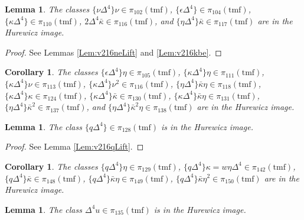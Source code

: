 \documentclass[10pt]{amsart}
\newcommand{\tmf}{\mathrm{tmf}}
\newtheorem{cor}[equation]{Corollary}
\newtheorem{lem}[equation]{Lemma}
\theoremstyle{definition}
\numberwithin{equation}{section}
\numberwithin{figure}{section}
\begin{document}

\begin{lem}\label{Lem:v216neekb}
The classes $\{ \nu \Delta^4\} \nu \in \pi_{102}(\tmf)$, $\{ \epsilon \Delta^4\} \in \pi_{104}(\tmf)$, $\{ \kappa \Delta^4 \} \in \pi_{110}(\tmf)$, $2 \Delta^4 \bar{\kappa} \in \pi_{116}(\tmf)$, and $\{\eta \Delta^4 \} \bar{\kappa} \in \pi_{117}(\tmf)$ are in the Hurewicz image.
\end{lem}

\begin{proof}
See Lemmas \ref{Lem:v216neLift} and \ref{Lem:v216kbe}. 
\end{proof}


\begin{cor}\label{Cor:v216low}
The classes $\{\epsilon \Delta^4\} \eta \in \pi_{105}(\tmf)$, $\{ \kappa \Delta^4 \} \eta \in \pi_{111}(\tmf)$, $\{ \kappa \Delta^4 \} \nu \in \pi_{113}(\tmf)$, $\{ \kappa \Delta^4 \} \nu^2 \in \pi_{116}(\tmf)$, $\{\eta \Delta^4 \} \bar{\kappa} \eta \in \pi_{118}(\tmf)$, $\{ \kappa \Delta^4 \} \kappa \in \pi_{124}(\tmf)$, $\{ \kappa \Delta^4 \} \bar{\kappa} \in \pi_{130}(\tmf)$, $\{ \kappa \Delta^4 \} \bar{\kappa} \eta \in \pi_{131}(\tmf)$, $\{\eta \Delta^4 \} \bar{\kappa}^2 \in \pi_{137}(\tmf)$, and $\{ \eta \Delta^4\} \bar{\kappa}^2 \eta \in \pi_{138}(\tmf)$ are in the Hurewicz image.
\end{cor}

\begin{lem}\label{Lem:v216q}
The class $\{q \Delta^4\} \in \pi_{128}(\tmf)$ is in the Hurewicz image. 
\end{lem}

\begin{proof}
See Lemma \ref{Lem:v216qLift}. 
\end{proof}

\begin{cor}\label{Cor:v216q}
The classes $\{ q \Delta^4 \} \eta \in \pi_{129}(\tmf)$, $\{q \Delta^4\}\kappa = w\eta\Delta^4 \in \pi_{142}(\tmf)$, $\{ q \Delta^4 \} \bar{\kappa} \in \pi_{148}(\tmf)$, $\{ q \Delta^4 \} \bar{\kappa} \eta \in \pi_{149}(\tmf)$, $\{ q \Delta^4 \} \bar{\kappa} \eta^2 \in \pi_{150}(\tmf)$ are in the Hurewicz image.
\end{cor}

\begin{lem}\label{Lem:a135}
The class $\Delta^4 u \in \pi_{135}(\tmf)$ is in the Hurewicz image. 
\end{lem}
\end{document}
